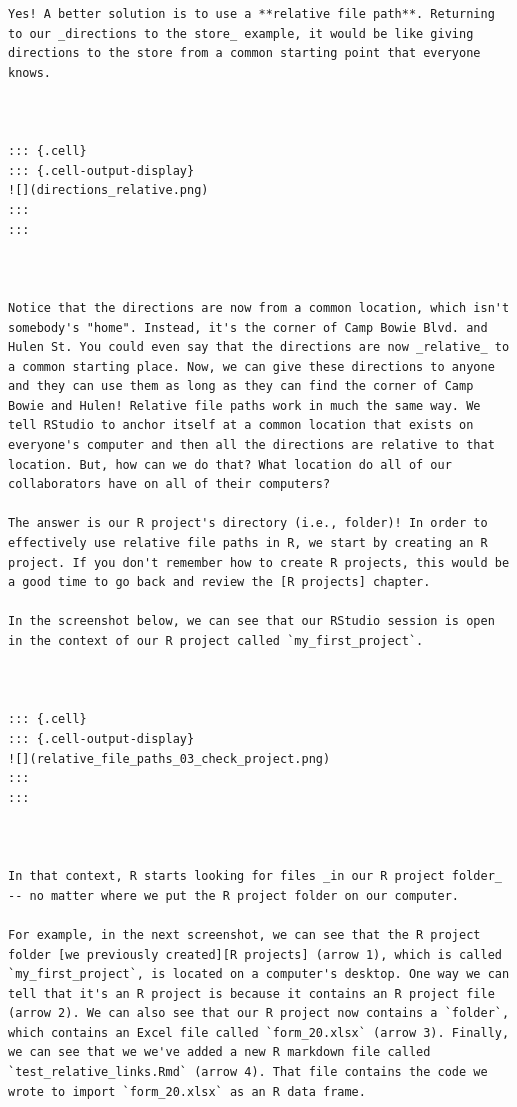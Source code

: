 \documentclass[
  letterpaper,
  DIV=11,
  numbers=noendperiod]{scrreprt}
\begin{document}
\begin{verbatim}
Yes! A better solution is to use a **relative file path**. Returning to our _directions to the store_ example, it would be like giving directions to the store from a common starting point that everyone knows. 



::: {.cell}
::: {.cell-output-display}
![](directions_relative.png)
:::
:::



Notice that the directions are now from a common location, which isn't somebody's "home". Instead, it's the corner of Camp Bowie Blvd. and Hulen St. You could even say that the directions are now _relative_ to a common starting place. Now, we can give these directions to anyone and they can use them as long as they can find the corner of Camp Bowie and Hulen! Relative file paths work in much the same way. We tell RStudio to anchor itself at a common location that exists on everyone's computer and then all the directions are relative to that location. But, how can we do that? What location do all of our collaborators have on all of their computers? 

The answer is our R project's directory (i.e., folder)! In order to effectively use relative file paths in R, we start by creating an R project. If you don't remember how to create R projects, this would be a good time to go back and review the [R projects] chapter. 

In the screenshot below, we can see that our RStudio session is open in the context of our R project called `my_first_project`. 



::: {.cell}
::: {.cell-output-display}
![](relative_file_paths_03_check_project.png)
:::
:::



In that context, R starts looking for files _in our R project folder_ -- no matter where we put the R project folder on our computer. 

For example, in the next screenshot, we can see that the R project folder [we previously created][R projects] (arrow 1), which is called `my_first_project`, is located on a computer's desktop. One way we can tell that it's an R project is because it contains an R project file (arrow 2). We can also see that our R project now contains a `folder`, which contains an Excel file called `form_20.xlsx` (arrow 3). Finally, we can see that we we've added a new R markdown file called `test_relative_links.Rmd` (arrow 4). That file contains the code we wrote to import `form_20.xlsx` as an R data frame. 




\end{verbatim}
\end{document}
